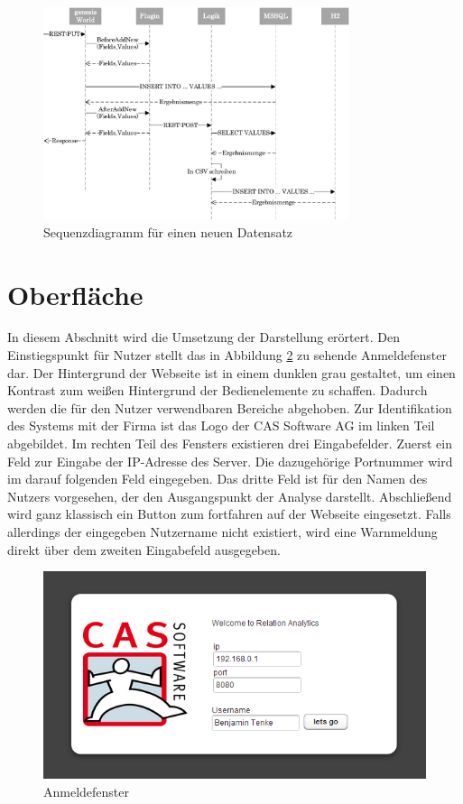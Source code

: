\begin{figure}[htbp]
\centering
  \includegraphics[width=0.8\textwidth]{pics/sequenzdiagramm.pdf}
\caption{Sequenzdiagramm für einen neuen Datensatz}
\label{konzept_sequenz}
\end{figure}



\section{Oberfläche}

In diesem Abschnitt wird die Umsetzung der Darstellung erörtert. Den Einstiegspunkt für Nutzer stellt das in Abbildung \ref{ergebniss_oberflaeche_anmeld} zu sehende Anmeldefenster dar. Der Hintergrund der Webseite ist in einem dunklen grau gestaltet, um einen Kontrast zum weißen Hintergrund der Bedienelemente zu schaffen. Dadurch werden die für den Nutzer verwendbaren Bereiche abgehoben. Zur Identifikation des Systems mit der Firma ist das Logo der CAS Software AG im linken Teil abgebildet. Im rechten Teil des Fensters existieren drei Eingabefelder. Zuerst ein Feld zur Eingabe der IP-Adresse des Server. Die dazugehörige Portnummer wird im darauf folgenden Feld eingegeben. Das dritte Feld ist für den Namen des Nutzers vorgesehen, der den Ausgangspunkt der Analyse darstellt. Abschließend wird ganz klassisch ein Button zum fortfahren auf der Webseite eingesetzt. Falls allerdings der eingegeben Nutzername nicht existiert, wird eine Warnmeldung direkt über dem zweiten Eingabefeld ausgegeben. 

\begin{figure}[htbp]
\centering
\includegraphics[scale=2.0]{pics/login.png}
\caption{Anmeldefenster}
\label{ergebniss_oberflaeche_anmeld}
\end{figure}

